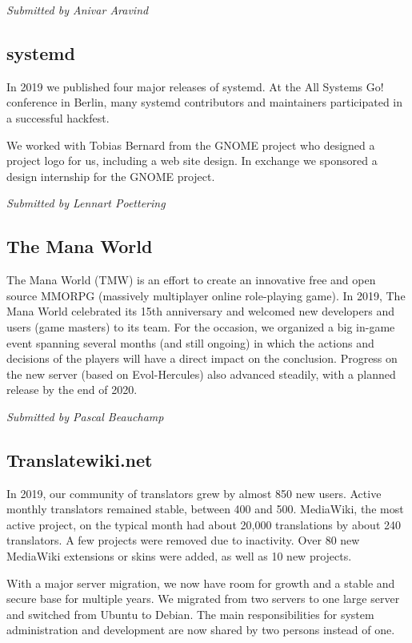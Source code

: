 \documentclass[a4paper]{report}
\begin{document}
{\em Submitted by Anivar Aravind}

\subsection{systemd}

In 2019 we published four major releases of systemd. At the All Systems
Go! conference in Berlin, many systemd contributors and maintainers
participated in a successful hackfest.

We worked with Tobias Bernard from the GNOME project who designed a
project logo for us, including a web site design. In exchange we
sponsored a design internship for the GNOME project.

{\em Submitted by Lennart Poettering}

\subsection{The Mana World}

The Mana World (TMW) is an effort to create an innovative free and open
source MMORPG (massively multiplayer online role-playing game).  In 2019,
The Mana World celebrated its 15th anniversary and welcomed new developers
and users (game masters) to its team. For the occasion, we organized a big
in-game event spanning several months (and still ongoing) in which the
actions and decisions of the players will have a direct impact on the
conclusion.  Progress on the new server (based on Evol-Hercules) also
advanced steadily, with a planned release by the end of 2020.

{\em Submitted by Pascal Beauchamp}

\subsection{Translatewiki.net}

In 2019, our community of translators grew by almost 850 new users.
Active monthly translators remained stable, between 400 and 500.
MediaWiki, the most active project, on the typical month had about
20,000 translations by about 240 translators. A few projects were
removed due to inactivity. Over 80 new MediaWiki extensions or skins
were added, as well as 10 new projects.

With a major server migration, we now have room for growth and a stable
and secure base for multiple years. We migrated from two servers to one
large server and switched from Ubuntu to Debian. The main
responsibilities for system administration and development are now
shared by two persons instead of one.
\end{document}
